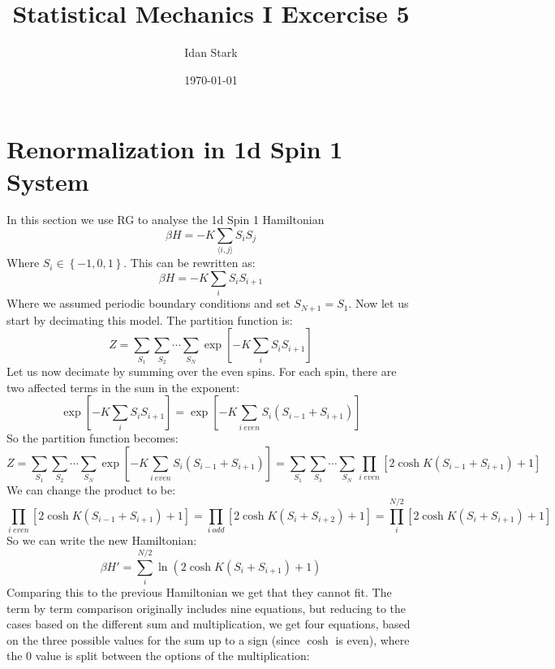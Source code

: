 \documentclass{article}
\title{Statistical Mechanics I Excercise 5}
\author{Idan Stark}
\date{\today}
\begin{document}
\maketitle

\section{Renormalization in 1d Spin 1 System}
In this section we use RG to analyse the 1d Spin 1 Hamiltonian
\begin{equation}
    \beta H = -K \sum_{\langle i, j \rangle}S_i S_j
\end{equation}
Where $S_i \in \left\{-1, 0, 1\right\}$. This can be rewritten as:
\begin{equation}
    \beta H = -K \sum_i S_i S_{i+1}
\end{equation}
Where we assumed periodic boundary conditions and set $S_{N+1} = S_1$. Now let us start by decimating this model. The partition function is:
\begin{equation}
    Z = \sum_{S_1}\sum_{S_2}\cdots\sum_{S_N} \exp[-K \sum_iS_i S_{i+1}]
\end{equation}
Let us now decimate by summing over the even spins. For each spin, there are two affected terms in the sum in the exponent:
\begin{equation}
    \exp[-K \sum_iS_i S_{i+1}] = \exp[-K \sum_{i \ even}S_i (S_{i-1} + S_{i+1})]
\end{equation}
So the partition function becomes:
\begin{equation}
    Z = \sum_{S_1}\sum_{S_2}\cdots\sum_{S_N} \exp[-K \sum_{i \ even}S_i (S_{i-1} + S_{i+1})] = \sum_{S_1}\sum_{S_3}\cdots\sum_{S_N} \prod_{i \ even} \left[2\cosh K(S_{i-1} + S_{i+1}) + 1\right]
\end{equation}
We can change the product to be:
\begin{equation}
    \prod_{i \ even} \left[2\cosh K(S_{i-1} + S_{i+1}) + 1\right] =
    \prod_{i \ odd} \left[2\cosh K(S_{i} + S_{i+2}) + 1\right] =
    \prod_{i}^{N/2} \left[2\cosh K(S_{i} + S_{i+1}) + 1\right]
\end{equation}
So we can write the new Hamiltonian:
\begin{equation}
   \beta H' = \sum_i^{N/2} \ln(2\cosh K(S_i + S_{i+1}) + 1)
\end{equation}
Comparing this to the previous Hamiltonian we get that they cannot fit. The term by term comparison originally includes nine equations, but reducing to the cases based on the different sum and multiplication, we get four equations, based on the three possible values for the sum up to a sign (since $\cosh$ is even), where the $0$ value is split between the options of the multiplication:
\end{document}
